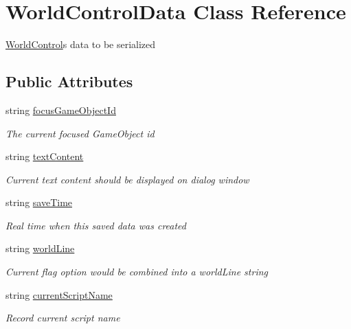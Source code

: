 \hypertarget{class_world_control_data}{}\section{World\+Control\+Data Class Reference}
\label{class_world_control_data}


\hyperlink{class_world_control}{World\+Control}\textquotesingle{}s data to be serialized  


\subsection*{Public Attributes}
\begin{DoxyCompactItemize}
\item 
string \hyperlink{class_world_control_data_a1016da14145c3cf49853b0dd1f0cadfd}{focus\+Game\+Object\+Id}
\begin{DoxyCompactList}\small\item\em The current focused Game\+Object id \end{DoxyCompactList}\item 
string \hyperlink{class_world_control_data_a097f2be6dfe4824c8a291bc377496656}{text\+Content}
\begin{DoxyCompactList}\small\item\em Current text content should be displayed on dialog window \end{DoxyCompactList}\item 
string \hyperlink{class_world_control_data_af238477a57c06f651bee36cfd63079a1}{save\+Time}
\begin{DoxyCompactList}\small\item\em Real time when this saved data was created \end{DoxyCompactList}\item 
string \hyperlink{class_world_control_data_af8a811def6db783cc181e2a18d2dfbc7}{world\+Line}
\begin{DoxyCompactList}\small\item\em Current flag option would be combined into a world\+Line string \end{DoxyCompactList}\item 
string \hyperlink{class_world_control_data_ab5ae8d21120cd2b51005b7a17c5be09f}{current\+Script\+Name}
\begin{DoxyCompactList}\small\item\em Record current script name \end{DoxyCompactList}\item 

\end{DoxyCompactItemize}
